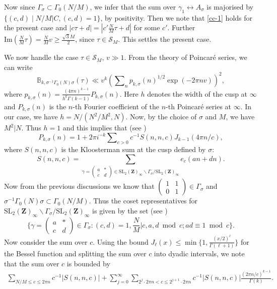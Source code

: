 \documentclass[11pt]{amsart}
\numberwithin{equation}{section}
\theoremstyle{plain}
\theoremstyle{definition}
\newcommand{\mbb}{\mathbb}
\newcommand{\mf}{\mathbf}
\newcommand{\mc}{\mathcal}
\newcommand{\mrm}{\mathrm}
\newcommand{\im}{\mrm{Im}}
\newcommand{\sumn}{\sum \nolimits}
\newcommand{\smat}[4]{\left( \begin{smallmatrix}#1&#2\\#3&#4\end{smallmatrix}\right)}
\newcommand{\sltwo}{\mrm{SL}_2(\mf Z)}
\begin{document}
Now since $\Gamma_\sigma\subset \Gamma_0( N/M)$, we infer that the sum over $\gamma_1 \leftrightarrow A_\sigma$ is majorised by $\{ (c,d) \mid N/M |C, (c,d)=1\}$, by positivity. Then we note that \eqref{cc-1} holds for the present case and $|c \tau+d| = |c' \frac{N}{M} \tau +d| $ for some $c'$.
Further $\im(\frac{N}{M} \tau) = \frac{N}{M} v \ge \frac{\sqrt{3}M}{2}$, since $\tau \in \mc S_M$. This settles the present case.

We now handle the case $\tau \in \mc S_M$, $v \gg 1$.
From the theory of Poincar\'e series, we can write
\begin{equation}
    \mbb B_{k,\sigma^{-1} \Gamma_0(N) \sigma}(\tau)\ll v^k\left(\sumn_n p_{k,\sigma}(n)^{1/2} \exp(-2\pi n v)\right)^2,
\end{equation}
where $p_{k,\sigma}(n)=\frac{(4\pi n)^{k-1}}{h^k\Gamma(k-1)}P_{k,\sigma}(n)$. Here $h$ denotes the width of the cusp at $\infty$ and $P_{k,\sigma}(n)$ is the $n$-th Fourier coefficient of the $n$-th Poincaré series at $\infty$. In our case, we have $h= N/(N^2/M^2, N)$. Now, by the choice of $\sigma$ and $M$, we have $M^2|N$. Thus $h=1$ and this implies that (see \cite[3.19]{iwaniecaut})
\begin{equation}
    P_{k,\sigma}(n)=1 + 2\pi i^{-k}\sumn_{c>0} c^{-1} S(n,n,c) J_{k-1}(4\pi n/c),
\end{equation}
where $S(n,n,c)$ is the Kloosterman sum at the cusp defined by $\sigma$: 
  \[   S(n,n,c)=\sum_{\gamma=\smat{a}{*}{c}{d}\in \sltwo_\infty\backslash \Gamma_\sigma/\sltwo_\infty } e_c(an+dn).\]
Now from the previous discussions we know that $\smat{1}{1}{0}{1}\in\Gamma_\sigma$ and $\sigma^{-1} \Gamma_0(N) \sigma\subset \Gamma_0( N/M)$. Thus the coset representatives for $\sltwo_\infty\backslash \Gamma_\sigma/\sltwo_\infty$ is given by the set (see \cite[Proposition 2.7]{iwaniecaut})
\begin{equation}
\{\gamma=\smat{a}{*}{c}{d} \in \Gamma_\sigma : (c,d)=1, \frac{N}{M}|c,  a,d \bmod c; ad \equiv 1 \bmod c  \}.
\end{equation}
Now consider the sum over $c$. Using the bound $J_\ell (x) \le \min\{1, \frac{(x/2)^\ell}{\Gamma(\ell +1)}\}$ for the Bessel function and splitting the sum over $c$ into dyadic intervals, we note that the sum over $c$ is bounded by
\begin{align}
    \sum_{N/M\le c\le 2\pi n} c^{-1}| S(n,n,c)| +\sum_{j=0}^{\infty}\sum_{2^j\cdot 2\pi n< c\le 2^{j+1}\cdot 2\pi n} c^{-1}|S(n,n,c)| \frac{(2\pi n/c)^{k-1}}{\Gamma(k)}.
\end{align}
\end{document}
